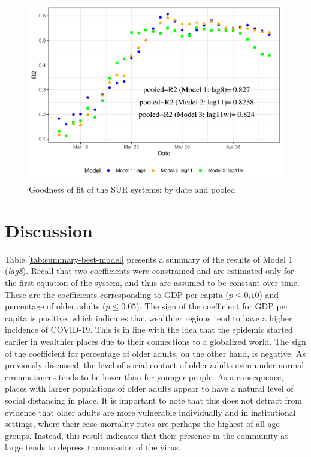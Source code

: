 \documentclass[]{elsarticle} %
\makeatletter
\def\maxwidth{\ifdim\Gin@nat@width>\linewidth\linewidth
\else\Gin@nat@width\fi}
\let\Oldincludegraphics\includegraphics
\renewcommand{\includegraphics}[1]{\Oldincludegraphics[width=\maxwidth]{#1}}
\makeatother
\begin{document}
\begin{figure}
\centering
\includegraphics{Environmental-Correlates-of-COVID19-Spain_files/figure-latex/goodness-of-fit-1.pdf}
\caption{\label{fig:goodness-of-fit} Goodness of fit of the SUR systems:
by date and pooled}
\end{figure}

\hypertarget{discussion}{%
\section{Discussion}\label{discussion}}

Table \ref{tab:summary-best-model} presents a summary of the results of
Model 1 (\emph{lag8}). Recall that two coefficients were constrained and
are estimated only for the first equation of the system, and thus are
assumed to be constant over time. These are the coefficients
corresponding to GDP per capita (\(p\leq0.10\)) and percentage of older
adults (\(p\leq0.05\)). The sign of the coefficient for GDP per capita
is positive, which indicates that wealthier regions tend to have a
higher incidence of COVID-19. This is in line with the idea that the
epidemic started earlier in wealthier places due to their connections to
a globalized world. The sign of the coefficient for percentage of older
adults, on the other hand, is negative. As previously discussed, the
level of social contact of older adults even under normal circumstances
tends to be lower than for younger people. As a consequence, places with
larger populations of older adults appear to have a natural level of
social distancing in place. It is important to note that this does not
detract from evidence that older adults are more vulnerable individually
and in institutional settings, where their case mortality rates are
perhaps the highest of all age groups. Instead, this result indicates
that their presence in the community at large tends to depress
transmission of the virus.
\end{document}
